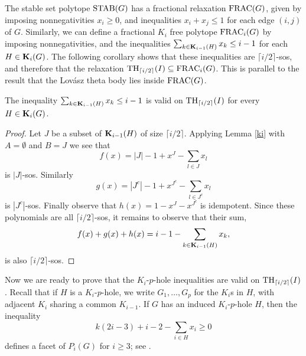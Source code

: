 The stable set polytope $\textup{STAB}(G)$ has a fractional relaxation $\textup{FRAC}(G)$, given by imposing nonnegativities $x_i \ge 0$, and inequalities $x_i + x_j \le 1$ for each edge $(i,j)$ of $G$. Similarly, we can define a fractional $K_i$ free polytope $\textup{FRAC}_i(G)$ by imposing nonnegativities, and the inequalities $\sum_{k \in \mathbf{K}_{i-1}(H)}x_k \le i-1$ for each $H \in \mathbf{K}_i(G)$. The following corollary shows that these inequalities are $\lceil i/2 \rceil$-sos, and therefore that the relaxation $\textup{TH}_{\lceil i/2 \rceil}(I) \subseteq \textup{FRAC}_i(G)$. This is parallel to the result that the Lov\'{a}sz theta body lies inside $\textup{FRAC}(G)$.

\begin{corollary} \label{frac}
The inequality $\sum_{k \in \mathbf{K}_{i-1}(H)}x_k \le i-1$ is valid on $\textup{TH}_{\lceil i/2 \rceil}(I)$ for every $H \in \mathbf{K}_i(G)$.
\end{corollary}
\begin{proof}
Let $J$ be a subset of $\mathbf{K}_{i-1}(H)$ of size $\lceil i/2 \rceil$. Applying Lemma \ref{ki} with 
$A=\emptyset$ and $B=J$ we see that 
 $$ f(x) =  |J|-1 + x^J - \sum_{l \in J} x_l $$ is $|J|$-sos. Similarly 
$$g(x)= |J^c|-1 + x^{J^c} - \sum_{l \in J^c} x_l $$ is $|J^c|$-sos. Finally observe that 
$h(x) = 1 - x^J - x^{J^c}$ is idempotent. Since these polynomials are all $\lceil i/2 \rceil$-sos, it remains to observe that their sum,
$$f(x)+g(x)+h(x)=i-1-\sum_{k \in \mathbf{K}_{i-1}(H)}x_k,$$
is also $\lceil i/2 \rceil$-sos.
\end{proof}

Now we are ready to prove that the $K_i$-$p$-hole inequalities are valid on $\textup{TH}_{\lceil i/2 \rceil}(I)$. Recall that if $H$ is a $K_i$-$p$-hole, we write $G_1,\ldots,G_p$ for the $K_i$s in $H$, with adjacent $K_i$ sharing a common $K_{i-1}$. If $G$ has an induced $K_i$-$p$-hole $H$, then the inequality
$$k(2i-3)+i-2 - \sum_{i \in H} x_i \geq 0$$
defines a facet of $P_i(G)$ for $i \ge 3$; see \cite{conforti}.

